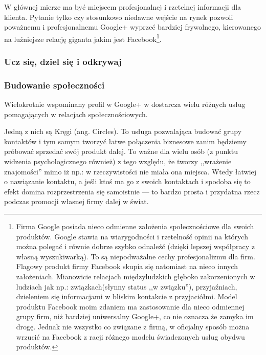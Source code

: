 W głównej mierze ma być miejscem profesjonalnej i rzetelnej informacji dla klienta. Pytanie tylko czy stosunkowo niedawne wejście na rynek pozwoli poważnemu i profesjonalnemu Google+ wyprzeć bardziej frywolnego, kierowanego na luźniejsze relację giganta jakim jest Facebook\footnote{Firma Google posiada nieco odmienne założenia społecznościowe dla swoich produktów. Google stawia na wiarygodności i rzetelność opinii na których można polegać i równie dobrze szybko odnaleźć (dzięki lepszej współpracy z własną wyszukiwarką). To są niepodważalne cechy profesjonalizmu dla firm. 
Flagowy produkt firmy Facebook skupia się natomiast na nieco innych założeniach. Mianowicie relacjach międzyludzkich głęboko zakorzenionych w ludziach jak np.: związkach(słynny status ,,w związku''), przyjaźniach, dzieleniem się informacjami w bliskim kontakcie z przyjaciółmi. Model produktu Facebook moim zdaniem ma zastosowanie dla nieco odmiennej grupy firm, niż bardziej uniwersalny Google+, co nie oznacza że zamyka im drogę. Jednak nie wszystko co związane z firmą, w oficjalny sposób można wrzucić na Facebook z racji różnego modelu świadczonych usług obydwu produktów.}.


\subsubsection{Ucz się, dziel się i odkrywaj}

\subsubsection{Budowanie społeczności}
Wielokrotnie wspominany profil w Google+ w dostarcza wielu różnych usług pomagających w relacjach społecznościowych.

Jedną z nich są Kręgi (ang. Circles). To usługa pozwalająca budować grupy kontaktów i tym samym tworzyć łatwe połączenia biznesowe zanim będziemy próbować sprzedać swój produkt dalej. To ważne dla wielu osób (z punktu widzenia psychologicznego również) z tego względu, że tworzy ,,wrażenie znajomości'' mimo iż np.: w rzeczywistości nie miała ona miejsca. Wtedy łatwiej o nawiązanie kontaktu, a jeśli ktoś ma go z swoich kontaktach i spodoba się to efekt domina rozprzestrzenia się samoistnie --- to bardzo prosta i przydatna rzecz podczas promocji własnej firmy dalej w świat.



